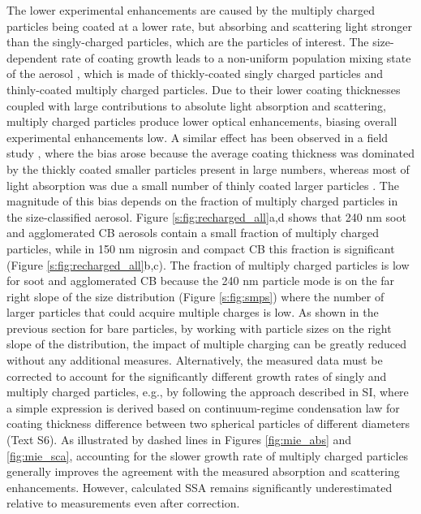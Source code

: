 \documentclass[12pt,authoryear]{elsarticle}
\begin{document}
The lower experimental enhancements are caused by the multiply charged particles being coated at a lower rate, but absorbing and scattering light stronger than the singly-charged particles, which are the particles of interest. The size-dependent rate of coating growth leads to a non-uniform population mixing state of the aerosol \citep{RN75}, which is made of thickly-coated singly charged particles and thinly-coated multiply charged particles. Due to their lower coating thicknesses coupled with large contributions to absolute light absorption and scattering, multiply charged particles produce lower optical enhancements, biasing overall experimental enhancements low. A similar effect has been observed in a field study \citep{RN76}, where the bias arose because the average coating thickness was dominated by the thickly coated smaller particles present in large numbers, whereas most of light absorption was due a small number of thinly coated larger particles \citep{RN52,RN75}. The magnitude of this bias depends on the fraction of multiply charged particles in the size-classified aerosol. Figure \ref{s:fig:recharged_all}a,d shows that 240 nm soot and agglomerated CB aerosols contain a small fraction of multiply charged particles, while in 150 nm nigrosin and compact CB this fraction is significant (Figure \ref{s:fig:recharged_all}b,c). The fraction of multiply charged particles is low for soot and agglomerated CB because the 240 nm particle mode is on the far right slope of the size distribution (Figure \ref{s:fig:smps}) where the number of larger particles that could acquire multiple charges is low. As shown in the previous section for bare particles, by working with particle sizes on the right slope of the distribution, the impact of multiple charging can be greatly reduced without any additional measures. Alternatively, the measured data must be corrected to account for the significantly different growth rates of singly and multiply charged particles, e.g., by following the approach described in SI, where a simple expression is derived based on continuum-regime condensation law for coating thickness difference between two spherical particles of different diameters (Text S6). As illustrated by dashed lines in Figures \ref{fig:mie_abs} and \ref{fig:mie_sca}, accounting for the slower growth rate of multiply charged particles generally improves the agreement with the measured absorption and scattering enhancements. However, calculated SSA remains significantly underestimated relative to measurements even after correction.
\end{document}
